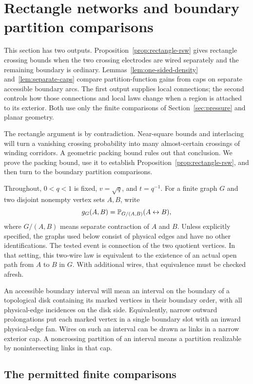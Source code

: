 \section{Rectangle networks and boundary partition comparisons}
\label{sec:rectangles}

This section has two outputs. Proposition~\ref{prop:rectangle-rsw}
gives rectangle crossing bounds when the two crossing electrodes are
wired separately and the remaining boundary is ordinary.
Lemmas~\ref{lem:one-sided-density} and~\ref{lem:separate-caps} compare
partition-function gains from caps on separate accessible boundary arcs.
The first output supplies local connections; the second controls how
those connections and local laws change when a region is attached to
its exterior. Both use only the finite comparisons of
Section~\ref{sec:pressure} and planar geometry.

The rectangle argument is by contradiction. Near-square bounds and
interlacing will turn a vanishing crossing probability into many
almost-certain crossings of winding corridors. A geometric packing
bound rules out that conclusion. We prove the packing bound, use it
to establish Proposition~\ref{prop:rectangle-rsw}, and then turn to
the boundary partition comparisons.

Throughout, $0<q<1$ is fixed, $v=\sqrt q$, and $t=q^{-1}$.  For a finite
graph $G$ and two disjoint nonempty vertex sets $A,B$, write
\[
 g_G(A,B)=\mathbb P_{G/(A,B)}(A\leftrightarrow B),
\]
where $G/(A,B)$ means separate contraction of $A$ and $B$.
Unless explicitly specified, the graphs used below consist of physical
edges and have no other identifications. The tested event is connection
of the two quotient vertices. In that setting, this two-wire law is
equivalent to the existence of an actual open path from $A$ to $B$ in
$G$. With additional wires, that equivalence must be checked afresh.

An accessible boundary interval will mean an interval on the boundary of
a topological disk containing its marked vertices in their boundary order,
with all physical-edge incidences on the disk side.  Equivalently, narrow
outward prolongations put each marked vertex in a single boundary slot
with an inward physical-edge fan.  Wires on such an interval can be drawn
as links in a narrow exterior cap.  A noncrossing partition of an interval
means a partition realizable by nonintersecting links in that cap.

\subsection{The permitted finite comparisons}

